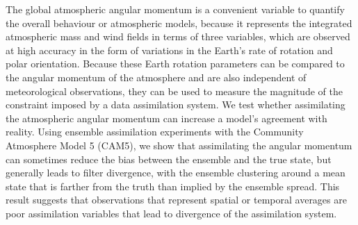The global atmospheric angular momentum is a convenient variable to quantify the overall behaviour or atmospheric models, because it represents the integrated atmospheric mass and wind fields in terms of three variables, which are observed at high accuracy in the form of variations in the Earth's rate of rotation and polar orientation. 
%
Because these Earth rotation parameters can be compared to the angular momentum of the atmosphere and are also independent of meteorological observations, they can be used to measure 
the magnitude of the constraint imposed by a data assimilation system.
%
We test whether assimilating the atmospheric angular momentum can increase a model's agreement with reality. 
Using ensemble assimilation experiments with the Community Atmosphere Model 5 (CAM5), we show that  
assimilating the angular momentum can sometimes reduce the bias between the ensemble and the true state, but generally leads to filter divergence, with the ensemble clustering around a mean state that is farther from the truth than implied by the ensemble spread. 
This result suggests that observations that represent spatial or temporal averages are poor assimilation variables that lead to divergence of the assimilation system.  
